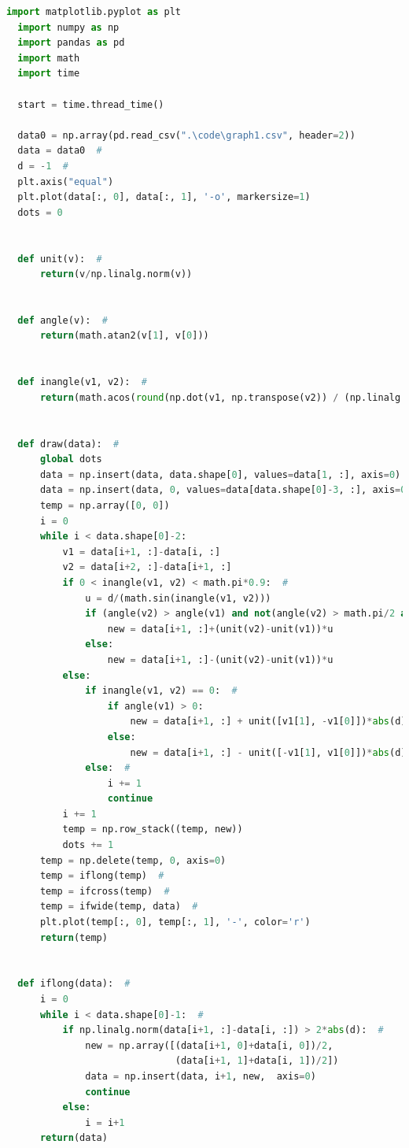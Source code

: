\documentclass{apmcmthesis}
\begin{document}
\begin{lstlisting}[language=Python,caption={The python source code of zigzag hatch}]
  import matplotlib.pyplot as plt
  import numpy as np
  import pandas as pd
  import math
  import time
  
  start = time.thread_time()
  
  data0 = np.array(pd.read_csv(".\code\graph1.csv", header=2))
  data = data0  #
  d = -1  #
  plt.axis("equal")
  plt.plot(data[:, 0], data[:, 1], '-o', markersize=1)
  dots = 0
  
  
  def unit(v):  #
      return(v/np.linalg.norm(v))
  
  
  def angle(v):  #
      return(math.atan2(v[1], v[0]))
  
  
  def inangle(v1, v2):  #
      return(math.acos(round(np.dot(v1, np.transpose(v2)) / (np.linalg.norm(v1)*np.linalg.norm(v2)), 9)))
  
  
  def draw(data):  #
      global dots
      data = np.insert(data, data.shape[0], values=data[1, :], axis=0)
      data = np.insert(data, 0, values=data[data.shape[0]-3, :], axis=0)
      temp = np.array([0, 0])
      i = 0
      while i < data.shape[0]-2:
          v1 = data[i+1, :]-data[i, :]
          v2 = data[i+2, :]-data[i+1, :]
          if 0 < inangle(v1, v2) < math.pi*0.9:  #
              u = d/(math.sin(inangle(v1, v2)))
              if (angle(v2) > angle(v1) and not(angle(v2) > math.pi/2 and angle(v1) < -math.pi/2)) or (angle(v2) < -math.pi/2 and angle(v1) > math.pi/2):
                  new = data[i+1, :]+(unit(v2)-unit(v1))*u
              else:
                  new = data[i+1, :]-(unit(v2)-unit(v1))*u
          else:
              if inangle(v1, v2) == 0:  #
                  if angle(v1) > 0:
                      new = data[i+1, :] + unit([v1[1], -v1[0]])*abs(d)
                  else:
                      new = data[i+1, :] - unit([-v1[1], v1[0]])*abs(d)
              else:  #
                  i += 1
                  continue
          i += 1
          temp = np.row_stack((temp, new))
          dots += 1
      temp = np.delete(temp, 0, axis=0)
      temp = iflong(temp)  #
      temp = ifcross(temp)  #
      temp = ifwide(temp, data)  #
      plt.plot(temp[:, 0], temp[:, 1], '-', color='r')
      return(temp)
  
  
  def iflong(data):  #
      i = 0
      while i < data.shape[0]-1:  #
          if np.linalg.norm(data[i+1, :]-data[i, :]) > 2*abs(d):  #
              new = np.array([(data[i+1, 0]+data[i, 0])/2,
                              (data[i+1, 1]+data[i, 1])/2])
              data = np.insert(data, i+1, new,  axis=0)
              continue
          else:
              i = i+1
      return(data)
  

\end{lstlisting}
\end{document}
